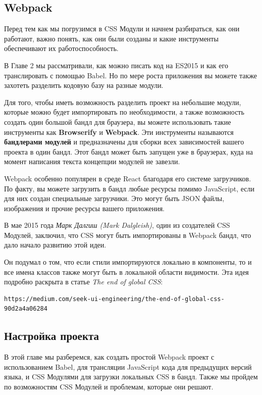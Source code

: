 \subsection{Webpack}

Перед тем как мы погрузимся в CSS Модули и начнем разбираться, как они работают, важно понять, как они были созданы и какие инструменты обеспечивают их работоспособность.

В Главе 2 мы рассматривали, как можно писать код на ES2015 и как его транслировать с помощью Babel. Но по мере роста приложения вы можете также захотеть разделить кодовую базу на разные модули.

Для того, чтобы иметь возможность разделить проект на небольшие модули, которые можно будет импортировать по необходимости, а также возможность создать один большой бандл для браузера, вы можете использовать такие инструменты как \textbf{Browserify} и \textbf{Webpack}. Эти инструменты называются \textbf{бандлерами модулей} и предназначены для сборки всех зависимостей вашего проекта в один бандл. Этот бандл может быть запущен уже в браузерах, куда на момент написания текста концепции модулей не завезли.

Webpack особенно популярен в среде React благодаря его системе загрузчиков. По факту, вы можете загрузить в бандл любые ресурсы помимо JavaScript, если для них создан специальные загрузчики. Это могут быть JSON файлы, изображения и прочие ресурсы вашего приложения.

В мае 2015 года \textit{Марк Далгиш (Mark Dalgleish)}, один из создателей CSS Модулей, заключил, что CSS могут быть импортированы в Webpack бандл, что дало начало развитию этой идеи.

Он подумал о том, что если стили импортируются локально в компоненты, то и все имена классов также могут быть в локальной области видимости. Эта идея подробно раскрыта в статье \textit{The end of global CSS}:

\begin{lstlisting}
https://medium.com/seek-ui-engineering/the-end-of-global-css-90d2a4a06284
\end{lstlisting} 

\subsection{Настройка проекта}

В этой главе мы разберемся, как создать простой Webpack проект с использованием Babel, для трансляции JavaScript кода для предыдущих версий языка, и CSS Модулями для загрузки локальных CSS в бандл. Также мы пройдем по возможностям CSS Модулей и проблемам, которые они решают. 


